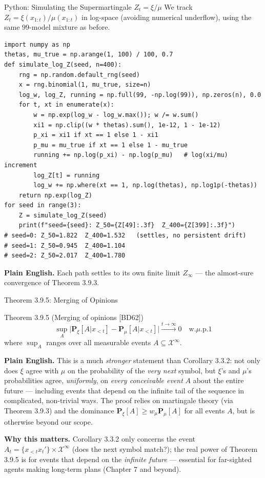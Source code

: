 \documentclass[aspectratio=169,10pt]{beamer}
\newcommand{\X}{\mathcal{X}}
\begin{document}
\begin{frame}[fragile]{Python: Simulating the Supermartingale $Z_t=\xi/\mu$}
  We track $Z_t=\xi(x_{1:t})/\mu(x_{1:t})$ in log-space (avoiding numerical
  underflow), using the same $99$-model mixture as before.
\begin{lstlisting}
import numpy as np
thetas, mu_true = np.arange(1, 100) / 100, 0.7
def simulate_log_Z(seed, n=400):
    rng = np.random.default_rng(seed)
    x = rng.binomial(1, mu_true, size=n)
    log_w, log_Z, running = np.full(99, -np.log(99)), np.zeros(n), 0.0
    for t, xt in enumerate(x):
        w = np.exp(log_w - log_w.max()); w /= w.sum()
        xi1 = np.clip((w * thetas).sum(), 1e-12, 1 - 1e-12)
        p_xi = xi1 if xt == 1 else 1 - xi1
        p_mu = mu_true if xt == 1 else 1 - mu_true
        running += np.log(p_xi) - np.log(p_mu)   # log(xi/mu) increment
        log_Z[t] = running
        log_w += np.where(xt == 1, np.log(thetas), np.log1p(-thetas))
    return np.exp(log_Z)
for seed in range(3):
    Z = simulate_log_Z(seed)
    print(f"seed={seed}: Z_50={Z[49]:.3f}  Z_400={Z[399]:.3f}")
# seed=0: Z_50=1.822  Z_400=1.532   (settles, no persistent drift)
# seed=1: Z_50=0.945  Z_400=1.104
# seed=2: Z_50=2.017  Z_400=1.780
\end{lstlisting}
  \textbf{Plain English.} Each path settles to its own finite limit
  $Z_\infty$ --- the almost-sure convergence of Theorem 3.9.3.
\end{frame}

\begin{frame}{Theorem 3.9.5: Merging of Opinions}
  \begin{block}{Theorem 3.9.5 (Merging of opinions [BD62])}
    \[
      \sup_A \big|\mathbf{P}_\xi[A|x_{<t}] - \mathbf{P}_\mu[A|x_{<t}]\big| \xrightarrow{t\to\infty} 0 \quad \text{w.}\mu\text{.p.1}
    \]
    where $\sup_A$ ranges over all measurable events $A\subseteq\X^\infty$.
  \end{block}
  \textbf{Plain English.} This is a much \emph{stronger} statement than
  Corollary 3.3.2: not only does $\xi$ agree with $\mu$ on the probability of
  the \emph{very next} symbol, but $\xi$'s and $\mu$'s probabilities agree,
  \emph{uniformly}, on \emph{every conceivable event} $A$ about the entire
  future --- including events that depend on the infinite tail of the
  sequence in complicated, non-trivial ways. The proof relies on martingale
  theory (via Theorem 3.9.3) and the dominance
  $\mathbf{P}_\xi[A]\ge w_\mu\mathbf{P}_\mu[A]$ for all events $A$, but is
  otherwise beyond our scope.

  \vspace{2mm}
  \textbf{Why this matters.} Corollary 3.3.2 only concerns the event
  $A_t=\{x_{<t}x_t'\}\times\X^\infty$ (does the next symbol match?); the real
  power of Theorem 3.9.5 is for events that depend on the \emph{infinite
  future} --- essential for far-sighted agents making long-term plans
  (Chapter 7 and beyond).
\end{frame}
\end{document}
